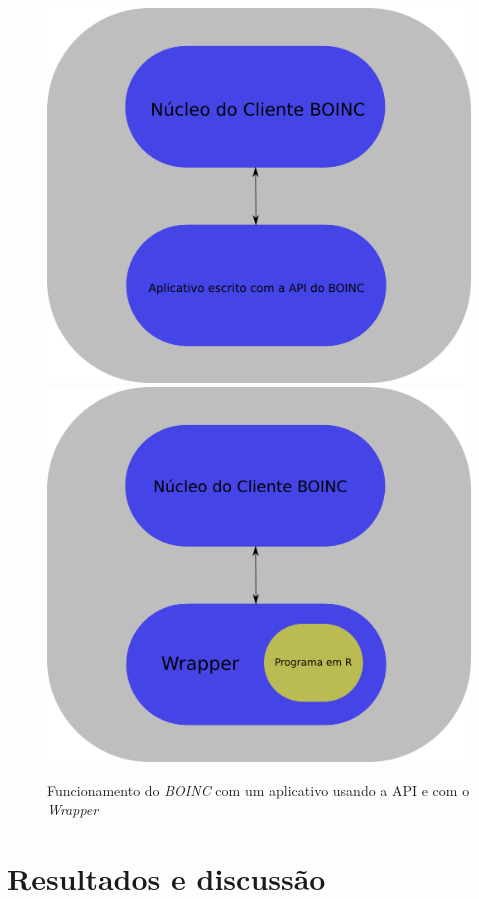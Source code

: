 \documentclass[b1]{sciposter}
\begin{document}
\begin{multicols}{2}
\begin{figure}[!h]
  \centering
  \includegraphics[scale=0.4]{boinc-diagram-normal.png}
  \includegraphics[scale=0.4]{boinc-diagram-wrapper.png}
  \caption{Funcionamento do \textit{BOINC} com um aplicativo usando a API e com o \textit{Wrapper}}
  \label{boinc_funcionamento_nw}
\end{figure}


\section{Resultados e discussão}


\end{multicols}
\end{document}
